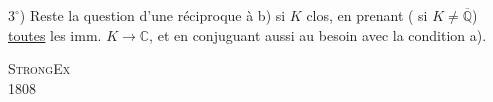 $3^\circ$) Reste la question d'une réciproque à b) si $K$  clos, en prenant ( si $K\ne\overline{\mathbb Q}$) \uline{toutes} les imm. $K\longrightarrow\mathbb C$, et en conjuguant aussi au besoin avec la condition a).
\par\noindent\textsc{ Strong}\hfill\textsc{Ex}\\
 1808\hfill{}

